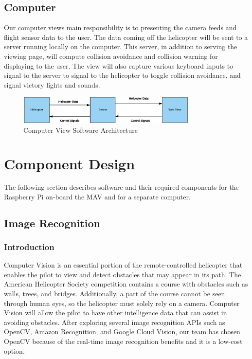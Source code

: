 \documentclass[onecolumn, oneside, letterpaper, draftclsnofoot, 10pt, compsoc]{IEEEtran}
\begin{document}
\subsection{Computer}
Our computer view\textquotesingle s main responsibility is to presenting the camera feeds and flight sensor data to the user. The data coming off the helicopter will be sent to a server running locally on the computer. This server, in addition to serving the viewing page, will compute collision avoidance and collision warning for displaying to the user. The view will also capture various keyboard inputs to signal to the server to signal to the helicopter to toggle collision avoidance, and signal victory lights and sounds.

\begin{figure}[h]
    \centering
    \includegraphics[width=0.8\textwidth]{graphics/computer_diagram.eps}
    \caption{Computer View Software Architecture}
    \label{fig:ComputerViewSoftwareArchitecture}
\end{figure}

\section{Component Design}
The following section describes software and their required components for the Raspberry Pi on-board the MAV and for a separate computer.

\subsection{Image Recognition}
\subsubsection{Introduction}
Computer Vision is an essential portion of the remote-controlled helicopter that enables the pilot to view and detect obstacles that may appear in its path. The American Helicopter Society competition contains a course with obstacles such as walls, trees, and bridges. Additionally, a part of the course cannot be seen through human eyes, so the helicopter must solely rely on a camera. Computer Vision will allow the pilot to have other intelligence data that can assist in avoiding obstacles. After exploring several image recognition APIs such as OpenCV, Amazon Recognition, and Google Cloud Vision, our team has chosen OpenCV because of the real-time image recognition benefits and it is a low-cost option.
\end{document}
